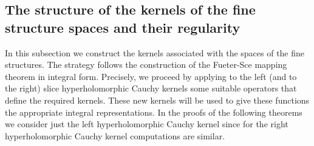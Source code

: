 \documentclass[reqno,11pt]{amsart}
\numberwithin{equation}{section}
\theoremstyle{definition}
\begin{document}
\subsection{The structure of the kernels of the fine structure spaces and their regularity}


In this subsection we construct the kernels associated with the
spaces of the fine structures.
The strategy follows the construction of the Fueter-Sce mapping theorem in integral form.
Precisely, we proceed by applying to the
left (and to the right) slice hyperholomorphic
 Cauchy kernels  some suitable operators that define the required kernels.
These new kernels
 will be used to give these functions the appropriate integral representations.
 In the proofs of the following theorems we consider just
 the left hyperholomorphic Cauchy kernel since for
  the right hyperholomorphic Cauchy kernel computations are similar.
\end{document}
